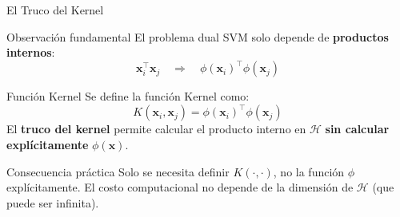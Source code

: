 \documentclass[aspectratio=169,xcolor=dvipsnames]{beamer}
\begin{document}
\begin{frame}{El Truco del Kernel}
    \begin{block}{Observación fundamental}
        El problema dual SVM solo depende de \textbf{productos internos}:
        \begin{equation}
            \mathbf{x}_i^\top \mathbf{x}_j \quad \Longrightarrow \quad \phi(\mathbf{x}_i)^\top \phi(\mathbf{x}_j)
        \end{equation}
    \end{block}

    \begin{exampleblock}{Función Kernel}
        Se define la función Kernel como:
        \begin{equation}
            K(\mathbf{x}_i, \mathbf{x}_j) = \phi(\mathbf{x}_i)^\top \phi(\mathbf{x}_j)
        \end{equation}
        El \textbf{truco del kernel} permite calcular el producto interno en $\mathcal{H}$ \textbf{sin calcular explícitamente} $\phi(\mathbf{x})$.
    \end{exampleblock}

    \begin{alertblock}{Consecuencia práctica}
        Solo se necesita definir $K(\cdot,\cdot)$, no la función $\phi$ explícitamente. El costo computacional no depende de la dimensión de $\mathcal{H}$ (que puede ser infinita).
    \end{alertblock}
\end{frame}
\end{document}
